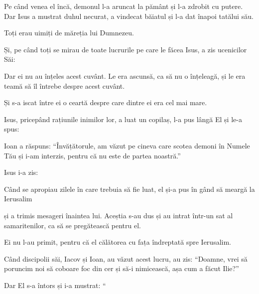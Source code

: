 {\par }{\PP {}Pe când venea el încă, demonul l-a aruncat la pământ și l-a zdrobit cu putere. Dar Isus a mustrat duhul necurat, a vindecat băiatul și l-a dat înapoi tatălui său.

Toți erau uimiți de măreția lui Dumnezeu.

\par }{\PP Și, pe când toți se mirau de toate lucrurile pe care le făcea Isus, a zis ucenicilor Săi:


Dar ei nu au înțeles acest cuvânt. Le era ascunsă, ca să nu o înțeleagă, și le era teamă să îl întrebe despre acest cuvânt.


\par }{\PP {}Și s-a iscat între ei o ceartă despre care dintre ei era cel mai mare.

Isus, pricepând rațiunile inimilor lor, a luat un copilaș, l-a pus lângă El și le-a spus:



\par }{\PP {}Ioan a răspuns: “Învățătorule, am văzut pe cineva care scotea demoni în Numele Tău și i-am interzis, pentru că nu este de partea noastră.”


\par }{\PP {}Isus i-a zis:
{}


\par }{\PP {}Când se apropiau zilele în care trebuia să fie luat, el și-a pus în gând să meargă la Ierusalim

și a trimis mesageri înaintea lui. Aceștia s-au dus și au intrat într-un sat al samaritenilor, ca să se pregătească pentru el.

Ei nu l-au primit, pentru că el călătorea cu fața îndreptată spre Ierusalim.

Când discipolii săi, Iacov și Ioan, au văzut acest lucru, au zis: “Doamne, vrei să poruncim noi să coboare foc din cer și să-i nimicească, așa cum a făcut Ilie?”


\par }{\PP {}Dar El s-a întors și i-a mustrat: “{}

}

